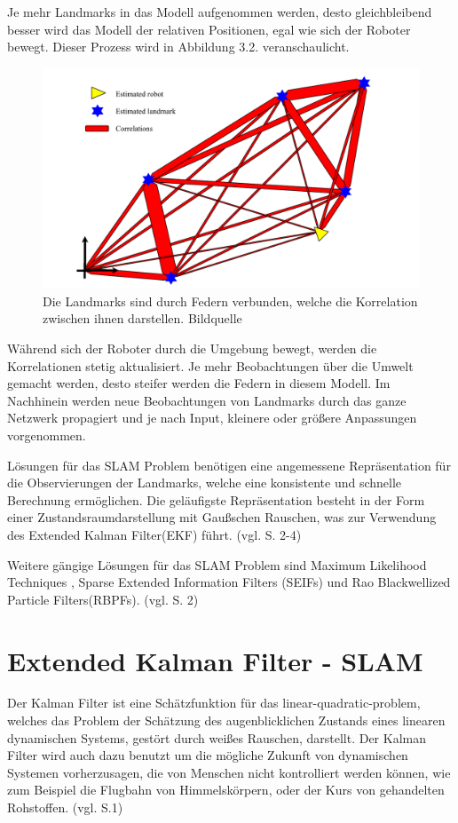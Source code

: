 Je mehr Landmarks in das Modell aufgenommen werden, desto gleichbleibend besser wird das Modell der relativen Positionen, egal wie sich der Roboter bewegt. Dieser Prozess wird in Abbildung 3.2. veranschaulicht.

\begin{figure}[H]
	\centering
	\includegraphics[scale=0.5]{slam_springs.png}
	\caption{Die Landmarks sind durch Federn verbunden, welche die Korrelation zwischen ihnen darstellen.  Bildquelle \cite{slam}}
\end{figure}  

Während sich der Roboter durch die Umgebung bewegt, werden die Korrelationen stetig aktualisiert. Je mehr Beobachtungen über die Umwelt gemacht werden, desto steifer werden die Federn in diesem Modell. Im Nachhinein werden neue Beobachtungen von Landmarks durch das ganze Netzwerk propagiert und je nach Input, kleinere oder größere Anpassungen vorgenommen.

Lösungen für das SLAM Problem benötigen eine angemessene Repräsentation für die Observierungen der Landmarks, welche eine konsistente und schnelle Berechnung ermöglichen. Die geläufigste Repräsentation besteht in der Form einer Zustandsraumdarstellung mit Gaußschen Rauschen, was zur Verwendung des \glqq Extended Kalman Filter\grqq (EKF) führt. (vgl. \cite{slam} S. 2-4)

Weitere gängige Lösungen für das SLAM Problem sind \glqq Maximum Likelihood Techniques \grqq, \glqq Sparse Extended Information Filters \grqq (SEIFs) und \glqq Rao Blackwellized Particle Filters\grqq  (RBPFs). 
 (vgl. \cite{rao} S. 2)

\section{Extended Kalman Filter - SLAM}
Der Kalman Filter ist eine Schätzfunktion für das \glqq linear-quadratic-problem\grqq , welches das Problem der Schätzung des augenblicklichen Zustands eines linearen dynamischen Systems, gestört durch weißes Rauschen, darstellt. Der Kalman Filter wird auch dazu benutzt um die mögliche Zukunft von dynamischen Systemen vorherzusagen, die von Menschen nicht kontrolliert werden können, wie zum Beispiel die Flugbahn von Himmelskörpern, oder der Kurs von gehandelten Rohstoffen. (vgl. \cite{ekf} S.1)

